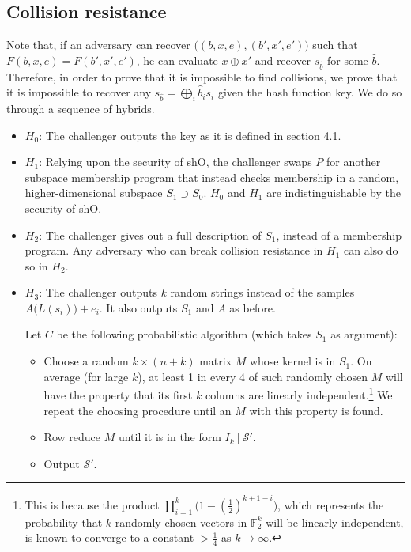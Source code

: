 \documentclass{article}
\begin{document}
\subsection{Collision resistance}
Note that, if an adversary can recover $\big( (b, x, e), (b', x', e') \big)$ such that $F(b, x, e) = F(b', x', e')$, he can evaluate $x \oplus x'$ and recover $s_{\hat b}$ for some $\hat b$. Therefore, in order to prove that it is impossible to find collisions, we prove that it is impossible to recover any $s_{\hat b} = \bigoplus_i \hat b_is_i$ given the hash function key. We do so through a sequence of hybrids.

\begin{itemize}
    \item $H_0$: The challenger outputs the key as it is defined in section 4.1.
    \item $H_1$: Relying upon the security of \textsf{shO}, the challenger swaps $P$ for another subspace membership program that instead checks membership in a random, higher-dimensional subspace $S_1 \supset S_0$. $H_0$ and $H_1$ are indistinguishable by the security of \textsf{shO}.
    \item $H_2$: The challenger gives out a full description of $S_1$, instead of a membership program. Any adversary who can break collision resistance in $H_1$ can also do so in $H_2$.
    \item $H_3$: The challenger outputs $k$ random strings instead of the samples $A\big( L(s_i) \big) + e_i$. It also outputs $S_1$ and $A$ as before.

	  Let $C$ be the following probabilistic algorithm (which takes $S_1$ as argument):
    \begin{itemize}
        \item Choose a random $k \times (n+k)$ matrix $M$ whose kernel is in $S_1$. On average (for large $k$), at least 1 in every 4 of such randomly chosen $M$ will have the property that its first $k$ columns are linearly independent.\footnote{This is because the product $\prod_{i=1}^k \big(1-(\frac{1}{2})^{k+1-i}\big)$, which represents the probability that $k$ randomly chosen vectors in $\mathbb{F}_2^k$ will be linearly independent, is known to converge to a constant $ > \frac{1}{4}$ as $k \rightarrow \infty$.} We repeat the choosing procedure until an $M$ with this property is found.
        \item Row reduce $M$ until it is in the form $I_k \: | \: \mathcal{S}'$.
        \item Output $\mathcal{S}'$.
    \end{itemize}


\end{itemize}
\end{document}
